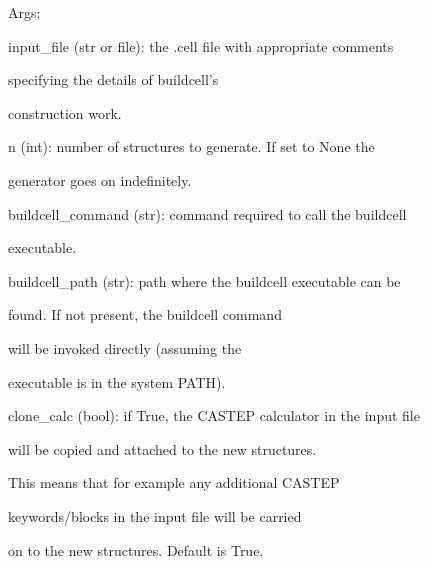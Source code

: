 \documentclass[letterpaper,10pt,english]{sphinxmanual}
\begin{document}
\begin{fulllineitems}
\begin{DUlineblock}{0em}
\item[] Args:
\item[]
\begin{DUlineblock}{\DUlineblockindent}
\item[] input\_file (str or file): the .cell file with appropriate comments
\item[]
\begin{DUlineblock}{\DUlineblockindent}
\item[] specifying the details of buildcell's
\item[] construction work.
\end{DUlineblock}
\item[] n (int): number of structures to generate. If set to None the
\item[]
\begin{DUlineblock}{\DUlineblockindent}
\item[] generator goes on indefinitely.
\end{DUlineblock}
\item[] buildcell\_command (str): command required to call the buildcell
\item[]
\begin{DUlineblock}{\DUlineblockindent}
\item[] executable.
\end{DUlineblock}
\item[] buildcell\_path (str): path where the buildcell executable can be
\item[]
\begin{DUlineblock}{\DUlineblockindent}
\item[] found. If not present, the buildcell command
\item[] will be invoked directly (assuming the
\item[] executable is in the system PATH).
\end{DUlineblock}
\item[] clone\_calc (bool): if True, the CASTEP calculator in the input file
\item[]
\begin{DUlineblock}{\DUlineblockindent}
\item[] will be copied and attached to the new structures.
\item[] This means that for example any additional CASTEP
\item[] keywords/blocks in the input file will be carried
\item[] on to the new structures. Default is True.
\end{DUlineblock}
\end{DUlineblock}
\end{DUlineblock}


\end{fulllineitems}
\end{document}
